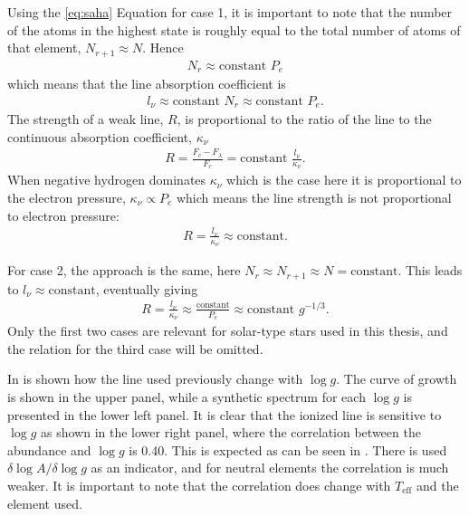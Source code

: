 {Using the \ref{eq:saha} Equation for case 1, it is important to note that the number of the atoms in the
highest state is roughly equal to the total number of atoms of that element, $N_{r+1}\approx N$.
Hence
\begin{align}
  N_r \approx \mathrm{constant}\,\, P_e
\end{align}
which means that the line absorption coefficient is
\begin{align}
  l_\nu \approx \mathrm{constant}\,\, N_r \approx \mathrm{constant}\,\, P_e.
\end{align}
The strength of a weak line, $R$, is proportional to the ratio of the line to the continuous
absorption coefficient, $\kappa_\nu$
\begin{align}
  R = \frac{F_c-F_\lambda}{F_c} = \mathrm{constant}\,\, \frac{l_\nu}{\kappa_\nu}.
\end{align}
When negative hydrogen dominates $\kappa_\nu$ which is the case here it is proportional to the
electron pressure, $\kappa_\nu\propto P_e$ which means the line strength is not proportional to
electron pressure:
\begin{align}
  R = \frac{l_\nu}{\kappa_\nu} \approx \mathrm{constant}.
\end{align}

For case 2, the approach is the same, here $N_r\approx N_{r+1}\approx N= \mathrm{constant}$. This
leads to $l_\nu\approx\mathrm{constant}$, eventually giving
\begin{align}
  R=\frac{l_\nu}{\kappa_\nu} \approx \frac{\mathrm{constant}}{P_e} \approx \mathrm{constant}\,\, g^{-1/3}.
\end{align}
Only the first two cases are relevant for solar-type stars used in this thesis, and the relation for
the third case will be omitted.

In  is shown how the  line used previously change with $\log g$. The
curve of growth is shown in the upper panel, while a synthetic spectrum for each $\log g$ is
presented in the lower left panel. It is clear that the ionized line is sensitive to $\log g$ as
shown in the lower right panel, where the correlation between the abundance and $\log g$ is 0.40.
This is expected as can be seen in \citet[][Table 16.1]{Gray2006}. There is used $\delta\log
A/\delta\log g$ as an indicator, and for neutral elements the correlation is much weaker. It is
important to note that the correlation does change with $T_\mathrm{eff}$ and the element used.

}
